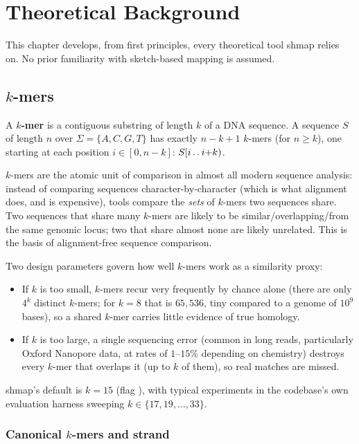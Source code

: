 \chapter{Theoretical Background}
\label{ch:theory}

This chapter develops, from first principles, every theoretical tool shmap relies on. No prior
familiarity with sketch-based mapping is assumed.

\section{$k$-mers}

A \textbf{$k$-mer} is a contiguous substring of length $k$ of a DNA sequence. A sequence $S$ of
length $n$ over $\Sigma=\{A,C,G,T\}$ has exactly $n-k+1$ $k$-mers (for $n \ge k$), one starting at
each position $i \in [0, n-k]$: $S[i \mathinner{.\,.} i{+}k)$.

$k$-mers are the atomic unit of comparison in almost all modern sequence analysis: instead of
comparing sequences character-by-character (which is what alignment does, and is expensive),
tools compare the \emph{sets} of $k$-mers two sequences share. Two sequences that share many
$k$-mers are likely to be similar/overlapping/from the same genomic locus; two that share almost
none are likely unrelated. This is the basis of alignment-free sequence comparison.

Two design parameters govern how well $k$-mers work as a similarity proxy:
\begin{itemize}
  \item If $k$ is too small, $k$-mers recur very frequently by chance alone (there are only
    $4^k$ distinct $k$-mers; for $k=8$ that is $65{,}536$, tiny compared to a genome of $10^9$
    bases), so a shared $k$-mer carries little evidence of true homology.
  \item If $k$ is too large, a single sequencing error (common in long reads, particularly Oxford
    Nanopore data, at rates of $1$--$15\%$ depending on chemistry) destroys every $k$-mer that
    overlaps it (up to $k$ of them), so real matches are missed.
\end{itemize}
shmap's default is $k=15$ (flag ), with typical experiments in the codebase's own
evaluation harness sweeping $k \in \{17,19,\dots,33\}$.

\subsection{Canonical $k$-mers and strand}
\label{sec:canonical-kmers}

